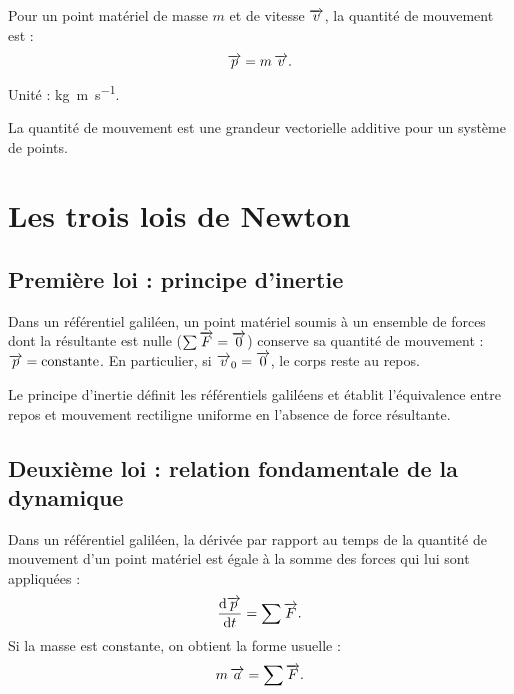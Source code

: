 \begin{definition}
Pour un point matériel de masse $m$ et de vitesse $\overrightarrow{v}$, la quantité de mouvement est :
\[
\overrightarrow{p} = m\,\overrightarrow{v}.
\]
Unité : \si{\kilogram\metre\per\second}.
\end{definition}

\begin{remarque}
La quantité de mouvement est une grandeur vectorielle additive pour un système de points.
\end{remarque}

\section{Les trois lois de Newton}

\subsection{Première loi : principe d’inertie}

\begin{loi}
Dans un référentiel galiléen, un point matériel soumis à un ensemble de forces dont la résultante est nulle ($\sum \overrightarrow{F} = \overrightarrow{0}$) conserve sa quantité de mouvement : $\overrightarrow{p} = \text{constante}$. En particulier, si $\overrightarrow{v}_0 = \overrightarrow{0}$, le corps reste au repos.
\end{loi}

\begin{aretenir}
Le principe d’inertie définit les référentiels galiléens et établit l’équivalence entre repos et mouvement rectiligne uniforme en l’absence de force résultante.
\end{aretenir}

\subsection{Deuxième loi : relation fondamentale de la dynamique}

\begin{loi}
Dans un référentiel galiléen, la dérivée par rapport au temps de la quantité de mouvement d’un point matériel est égale à la somme des forces qui lui sont appliquées :
\[
\dfrac{\mathrm{d}\overrightarrow{p}}{\mathrm{d}t} = \sum \overrightarrow{F}.
\]
Si la masse est constante, on obtient la forme usuelle :
\[
m\,\overrightarrow{a} = \sum \overrightarrow{F}.
\]
\end{loi}

